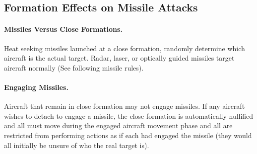 \subsection{Formation Effects on Missile Attacks}

\paragraph{Missiles Versus Close Formations.} Heat seeking missiles launched at a close formation, randomly determine which aircraft is the actual target. Radar, laser, or optically guided missiles target aircraft normally (See following missile rules).

\paragraph{Engaging Missiles.} Aircraft that remain in close formation may not engage missiles. If any aircraft wishes to detach to engage a missile, the close formation is automatically nullified and all must move during the engaged aircraft movement phase and all are restricted from performing actions as if each had engaged the missile (they would all initially be unsure of who the real target is).
